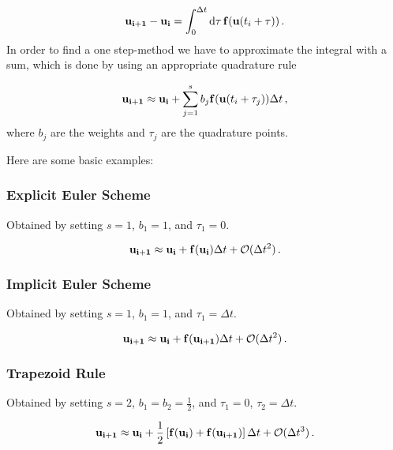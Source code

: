 \documentclass[12pt, class=report, crop=false]{standalone}
\begin{document}
\begin{equation}
  \vb{u_{i+1}} - \vb{u_i} = \int_0^{\Delta t} \dd{\tau} \vb{f} (\vb{u}(t_i +\tau))\,.
\end{equation}
In order to find a one step-method we have to approximate the integral with a sum, which is done by using an appropriate quadrature rule

\begin{equation}
  \vb{u_{i+1}} \approx \vb{u_i} + \sum_{j=1}^s b_j \vb{f} (\vb{u}(t_i + \tau_j)) \Delta t\,,
\end{equation}
where \(b_j\) are the weights and \(\tau_j\) are the quadrature points.

Here are some basic examples:

\subsubsection{Explicit Euler Scheme}

Obtained by setting \(s=1\), \(b_1=1\), and \(\tau_1 = 0\).

\begin{equation}
  \vb{u_{i+1}} \approx \vb{u_i} + \vb{f}(\vb{u_i}) \Delta t + \mathcal{O}(\Delta t^2)\,.
\end{equation}

\subsubsection{Implicit Euler Scheme}

Obtained by setting \(s=1\), \(b_1=1\), and \(\tau_1 = \Delta t\).

\begin{equation}
  \vb{u_{i+1}} \approx \vb{u_i} + \vb{f}(\vb{u_{i+1}}) \Delta t + \mathcal{O}(\Delta t^2)\,.
\end{equation}

\subsubsection{Trapezoid Rule}

Obtained by setting \(s=2\), \(b_1=b_2=\frac{1}{2}\), and \(\tau_1 = 0\), \(\tau_2 = \Delta t\).

\begin{equation}
  \vb{u_{i+1}} \approx \vb{u_i} + \frac{1}{2} \left[\vb{f}(\vb{u_{i}}) + \vb{f}(\vb{u_{i+1}}) \right] \Delta t + \mathcal{O}(\Delta t^3)\,.
\end{equation}
\end{document}
